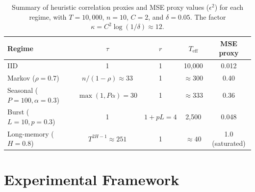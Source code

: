 \documentclass[sensors,article,submit,pdftex,moreauthors]{Definitions/mdpi}
\newcommand{\Teff}{T_{\mathrm{eff}}}
\providecommand{\DIFaddbeginFL}{} %
\providecommand{\DIFaddendFL}{} %
\providecommand{\DIFdelbeginFL}{} %
\providecommand{\DIFdelendFL}{} %
\begin{document}
\begin{table}[t]
\centering
\caption{Summary of heuristic correlation proxies and MSE proxy values ($\epsilon^2$) for each regime, with $T = 10{,}000$, $n = 10$, $C = 2$, and $\delta = 0.05$. The factor $\kappa = C^2 \log(1/\delta) \approx 12$.}
\label{tab:bounds}
\DIFdelbeginFL %
\DIFdelendFL \DIFaddbeginFL \begin{tabular}{@{}lcccc@{}}
\toprule
Regime & $\tau$ & $r$ & $\Teff$ & MSE proxy \\
\midrule
IID & 1 & 1 & 10{,}000 & 0.012 \\
Markov ($\rho{=}0.7$) & $n/(1{-}\rho) \approx 33$ & 1 & $\approx 300$ & 0.40 \\
Seasonal ($P{=}100, \alpha{=}0.3$) & $\max(1, P\alpha) = 30$ & 1 & $\approx 333$ & 0.36 \\
Burst ($L{=}10, p{=}0.3$) & 1 & $1{+}pL = 4$ & 2{,}500 & 0.048 \\
Long-memory ($H{=}0.8$) & $T^{2H{-}1} \approx 251$ & 1 & $\approx 40$ & 1.0 (saturated) \\
\bottomrule
\end{tabular}
\DIFaddendFL 

\end{table}


\section{Experimental Framework}
\label{sec:experiments}
\end{document}
